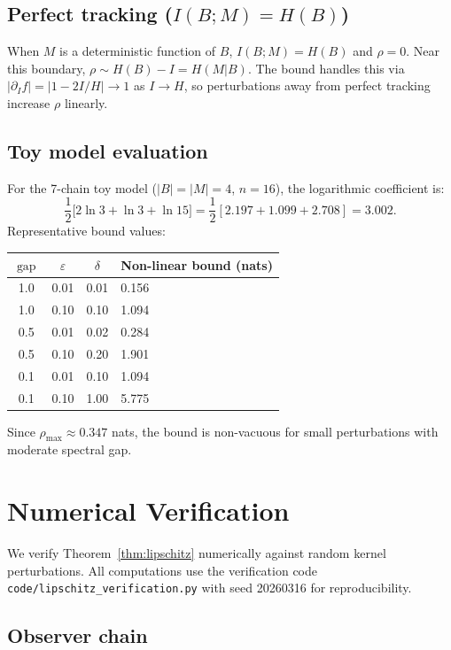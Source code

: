 \documentclass[11pt,a4paper]{article}
\DeclareMathOperator{\gap}{gap}
\begin{document}
\subsection{Perfect tracking ($I(B;M) = H(B)$)}
When $M$ is a deterministic function of $B$, $I(B;M) = H(B)$ and
$\rho = 0$.  Near this boundary, $\rho \sim H(B) - I = H(M|B)$.
The bound handles this via $|\partial_I f| = |1 - 2I/H| \to 1$ as
$I \to H$, so perturbations away from perfect tracking increase
$\rho$ linearly.

\subsection{Toy model evaluation}
For the 7-chain toy model ($|B| = |M| = 4$, $n = 16$), the logarithmic
coefficient is:
\[
  \frac{1}{2}\bigl[2\ln 3 + \ln 3 + \ln 15\bigr]
  = \frac{1}{2}[2.197 + 1.099 + 2.708] = 3.002.
\]
Representative bound values:
\begin{center}
\begin{tabular}{@{}cccl@{}}
\toprule
$\gap$ & $\varepsilon$ & $\delta$ & Non-linear bound (nats) \\
\midrule
1.0 & 0.01 & 0.01 & 0.156 \\
1.0 & 0.10 & 0.10 & 1.094 \\
0.5 & 0.01 & 0.02 & 0.284 \\
0.5 & 0.10 & 0.20 & 1.901 \\
0.1 & 0.01 & 0.10 & 1.094 \\
0.1 & 0.10 & 1.00 & 5.775 \\
\bottomrule
\end{tabular}
\end{center}
Since $\rho_{\max} \approx 0.347$ nats, the bound is non-vacuous
for small perturbations with moderate spectral gap.


\section{Numerical Verification}\label{sec:numerical}

We verify Theorem~\ref{thm:lipschitz} numerically against random
kernel perturbations.  All computations use the verification code
\texttt{code/lipschitz\_verification.py} with seed 20260316 for
reproducibility.

\subsection{Observer chain}
\end{document}
